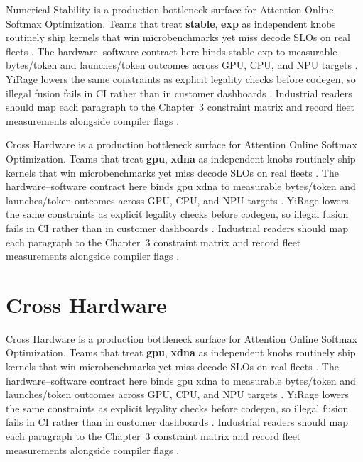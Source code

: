 Numerical Stability is a production bottleneck surface for Attention Online Softmax Optimization. Teams that treat \textbf{stable}, \textbf{exp} as independent knobs routinely ship kernels that win microbenchmarks yet miss decode SLOs on real fleets \citep{patel2025llminference,nvidia2022hopper}. The hardware--software contract here binds stable exp to measurable bytes/token and launches/token outcomes across GPU, CPU, and NPU targets \citep{taxbreak2026,semianalysis2024tma}. YiRage lowers the same constraints as explicit legality checks before codegen, so illegal fusion fails in CI rather than in customer dashboards \citep{memoryfloor2026,amd2024xdna}. Industrial readers should map each paragraph to the Chapter~3 constraint matrix and record fleet measurements alongside compiler flags \citep{nvidia2022hopper,amd2024aie}.

Cross Hardware is a production bottleneck surface for Attention Online Softmax Optimization. Teams that treat \textbf{gpu}, \textbf{xdna} as independent knobs routinely ship kernels that win microbenchmarks yet miss decode SLOs on real fleets \citep{taxbreak2026,semianalysis2024tma}. The hardware--software contract here binds gpu xdna to measurable bytes/token and launches/token outcomes across GPU, CPU, and NPU targets \citep{memoryfloor2026,amd2024xdna}. YiRage lowers the same constraints as explicit legality checks before codegen, so illegal fusion fails in CI rather than in customer dashboards \citep{nvidia2022hopper,amd2024aie}. Industrial readers should map each paragraph to the Chapter~3 constraint matrix and record fleet measurements alongside compiler flags \citep{semianalysis2024tma,dlbook}.

\section{Cross Hardware}
\label{sec:cross_hardware}

Cross Hardware is a production bottleneck surface for Attention Online Softmax Optimization. Teams that treat \textbf{gpu}, \textbf{xdna} as independent knobs routinely ship kernels that win microbenchmarks yet miss decode SLOs on real fleets \citep{memoryfloor2026,amd2024xdna}. The hardware--software contract here binds gpu xdna to measurable bytes/token and launches/token outcomes across GPU, CPU, and NPU targets \citep{nvidia2022hopper,amd2024aie}. YiRage lowers the same constraints as explicit legality checks before codegen, so illegal fusion fails in CI rather than in customer dashboards \citep{semianalysis2024tma,dlbook}. Industrial readers should map each paragraph to the Chapter~3 constraint matrix and record fleet measurements alongside compiler flags \citep{amd2024xdna,dao2022flashattention}.

